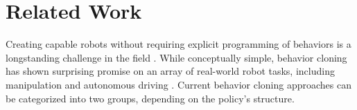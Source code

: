 \section{Related Work}
Creating capable robots without requiring explicit programming of behaviors is a longstanding challenge in the field \cite{atkeson1997robot, argall2009survey, ravichandar2020recent}.
While conceptually simple, behavior cloning has shown surprising promise on an array of real-world robot tasks, including manipulation \cite{zhang2018deep, florence2019self, mandlekar2020learning, mandlekar2020iris, zeng2021transporter, rahmatizadeh2018vision, avigal2022speedfolding} and autonomous driving \cite{pomerleau1988alvinn, bojarski2016end}. Current behavior cloning approaches can be categorized into two groups, depending on the policy's structure.

%